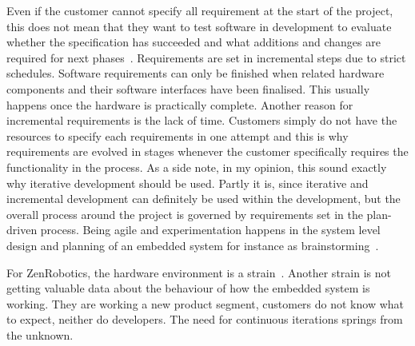 \documentclass[english]{tktltiki2}
\begin{document}
Even if the customer cannot specify all requirement at the start of the project, this does not mean that they want to test software in development to evaluate whether the specification has succeeded and what additions and changes are required for next phases~\cite{Hol15b}. Requirements are set in incremental steps due to strict schedules. Software requirements can only be finished when related hardware components and their software interfaces have been finalised. This usually happens once the hardware is practically complete. Another reason for incremental requirements is the lack of time. Customers simply do not have the resources to specify each requirements in one attempt and this is why requirements are evolved in stages whenever the customer specifically requires the functionality in the process. As a side note, in my opinion, this sound exactly why iterative development should be used. Partly it is, since iterative and incremental development can definitely be used within the development, but the overall process around the project is governed by requirements set in the plan-driven process. Being agile and experimentation happens in the system level design and planning of an embedded system for instance as brainstorming~\cite{Hol15b}.

For ZenRobotics, the hardware environment is a strain~\cite{Hol15a}. Another strain is not getting valuable data about the behaviour of how the embedded system is working. They are working a new product segment, customers do not know what to expect, neither do developers. The need for continuous iterations springs from the unknown.
\end{document}
